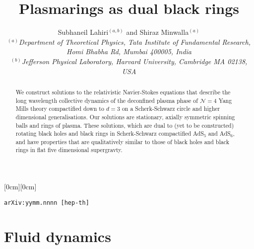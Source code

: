 \documentclass[12pt,a4paper]{article}
\title{Plasmarings as dual black rings}
\author{Subhaneil Lahiri$^{(a,b)}$ and
        Shiraz Minwalla$^{(a)}$
\\
%
%
\small{\emph{$^{(a)}$Department of Theoretical Physics,
                   Tata Institute of Fundamental Research,}}\\
\small{\emph{Homi Bhabha Rd, Mumbai 400005, India}}\\
%
\small{\emph{$^{(b)}$Jefferson Physical Laboratory,
                   Harvard University, Cambridge MA 02138, USA}}
%
}
\newcommand{\preprintno}[3]{\hfill\raisebox{#1}[0cm][0cm]{
\begin{minipage}[t]{#2}\begin{flushright} #3 \end{flushright}\end{minipage}}
\vspace*{-\baselinestretch\baselineskip}}
\newcommand{\CN}{\mathcal{N}}
\begin{document}
\maketitle

\preprintno{8cm}{6cm}{
    \texttt{arXiv:yymm.nnnn [hep-th]}
}



\begin{abstract}
We construct solutions to the relativistic Navier-Stokes equations
that describe the long wavelength collective dynamics of the
deconfined plasma phase of $\CN=4$ Yang Mills theory compactified
down to $d=3$ on a Scherk-Schwarz circle and higher dimensional generalisations. Our solutions are stationary, axially symmetric spinning balls and rings of plasma. These solutions, which are dual to (yet to be constructed) rotating black holes and black rings in Scherk-Schwarz compactified AdS$_5$ and AdS$_6$, and have properties that are qualitatively similar to those of black holes and black rings in flat five dimensional supergravty.
\end{abstract}

\tableofcontents





\section{Fluid dynamics}\label{sec:stress}
\end{document}
